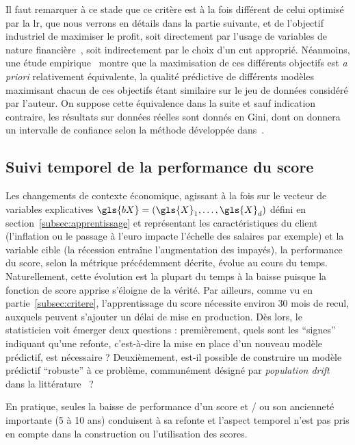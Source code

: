 Il faut remarquer à ce stade que ce critère est à la fois différent de celui optimisé par la \gls{lr}, que nous verrons en détails dans la partie suivante, et de l'objectif industriel de maximiser le profit, soit directement par l'usage de variables de nature financière~\cite{finlay2010credit}, soit indirectement par le choix d'un \gls{cut} approprié. Néanmoins, une étude empirique~\cite{finlay2009we} montre que la maximisation de ces différents objectifs est \textit{a priori} relativement équivalente, la qualité prédictive de différents modèles maximisant chacun de ces objectifs étant similaire sur le jeu de données considéré par l'auteur. On suppose cette équivalence dans la suite et sauf indication contraire, les résultats sur données réelles sont donnés en Gini, dont on donnera un intervalle de confiance selon la méthode développée dans~\cite{sun2014fast}.



\subsection{Suivi temporel de la performance du \gls{score}}

Les changements de contexte économique, agissant à la fois sur le vecteur de variables explicatives $\gls{bX} = (\gls{X}_1, \dots, \gls{X}_d)$ défini en section~\ref{subsec:apprentissage} et représentant les caractéristiques du client (l'inflation ou le passage à l'euro impacte l'échelle des salaires par exemple) et la variable cible (la récession entraîne l'augmentation des impayés), la performance du \gls{score}, selon la métrique précédemment décrite, évolue au cours du temps. Naturellement, cette évolution est la plupart du temps à la baisse puisque la fonction de \gls{score} apprise s'éloigne de la vérité. Par ailleurs, comme vu en partie~\ref{subsec:critere}, l'apprentissage du \gls{score} nécessite environ 30 mois de recul, auxquels peuvent s'ajouter un délai de mise en production. Dès lors, le statisticien voit émerger deux questions : premièrement, quels sont les ``signes'' indiquant qu'une refonte, c'est-à-dire la mise en place d'un nouveau modèle prédictif, est nécessaire ? Deuxièmement, est-il possible de construire un modèle prédictif ``robuste'' à ce problème, communément désigné par \textit{population drift} dans la littérature~\cite{hand1997statistical} ?

En pratique, seules la baisse de performance d'un \gls{score} et / ou son ancienneté importante (5 à 10 ans) conduisent à sa refonte et l'aspect temporel n'est pas pris en compte dans la construction ou l'utilisation des \glspl{score}.


